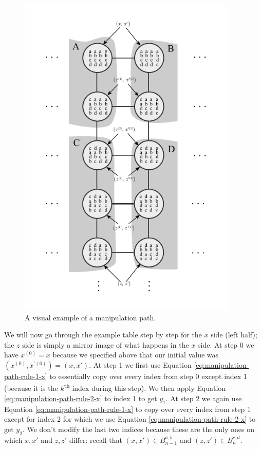 	\begin{figure}[ht]
		\begin{center}
			\includegraphics[width=4.1in]{../figures/diagram7.pdf}
			\caption{A visual example of a manipulation path.}
			\label{fig:manipulation-path}
		\end{center}
	\end{figure}


	We will now go through the example table step by step for the $x$ side (left half); the $z$ side is simply a mirror image of what happens in the $x$ side. At step 0 we have $x^{(0)} = x$ because we specified above that our initial value was $(x^{(0)}, x^{\prime(0)}) = (x,x')$. At step 1 we first use Equation \ref{eq:manipulation-path-rule-1-x} to essentially copy over every index from step 0 except index 1 (because it is the $k$\textsuperscript{th} index during this step). We then apply Equation \ref{eq:manipulation-path-rule-2-x} to index 1 to get $y_1$. At step 2 we again use Equation \ref{eq:manipulation-path-rule-1-x} to copy over every index from step 1 except for index 2 for which we use Equation \ref{eq:manipulation-path-rule-2-x} to get $y_2$. We don't modify the last two indices because these are the only ones on which $x, x'$ and $z, z'$ differ: recall that $(x, x') \in B_{n-1}^{a,b}$ and $(z, z') \in B_{n}^{c,d}$.

